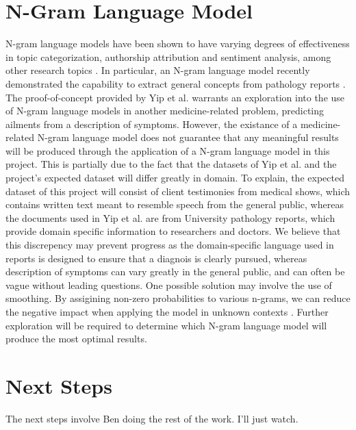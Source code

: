 \documentclass[12pt, final, onecolumn, comsoc, conference]{IEEEtran}
\begin{document}
\section{N-Gram Language Model} N-gram language models have been shown to have
varying degrees of effectiveness in topic categorization, authorship attribution
and sentiment analysis, among other research topics \cite{n-gram-analysis}. In
particular, an N-gram language model recently demonstrated the capability to
extract general concepts from pathology reports \cite{yip}. The proof-of-concept
provided by Yip et al. warrants an exploration into the use of N-gram language
models in another medicine-related problem, predicting ailments from a
description of symptoms. However, the existance of a medicine-related N-gram
language model does not guarantee that any meaningful results will be produced
through the application of a N-gram language model in this project. This is
partially due to the fact that the datasets of Yip et al. and the project's
expected dataset will differ greatly in domain. To explain, the expected dataset
of this project will consist of client testimonies from medical shows, which
contains written text meant to resemble speech from the general public, whereas
the documents used in Yip et al. are from University pathology reports, which
provide domain specific information to researchers and doctors. We believe that
this discrepency may prevent progress as the domain-specific language used in
reports is designed to ensure that a diagnois is clearly pursued, whereas
description of symptoms can vary greatly in the general public, and can often be
vague without leading questions. One possible solution may involve the use of
smoothing. By assigining non-zero probabilities to various n-grams, we can
reduce the negative impact when applying the model in unknown contexts
\cite{class}. Further exploration will be required to determine which N-gram
language model will produce the most optimal results.

\section{Next Steps} The next steps involve Ben doing the rest of the work. I'll
just watch.


\end{document}
